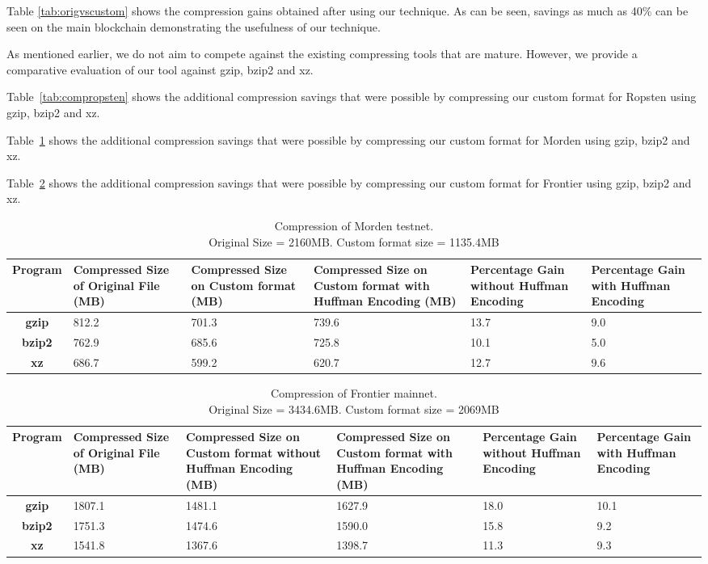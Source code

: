 \FloatBarrier
Table \ref{tab:origvscustom} shows the compression gains obtained after using our technique.
As can be seen, savings as much as 40\% can be seen on the main blockchain demonstrating the usefulness
of our technique.

As mentioned earlier, we do not aim to compete against the existing compressing tools that are mature.
However, we provide a comparative evaluation of our tool against gzip, bzip2 and xz. 

Table~\ref{tab:compropsten} 
shows the additional compression savings that were possible by compressing 
our custom format for Ropsten using gzip, bzip2 and xz.

Table~\ref{tab:compmorden} 
shows the additional compression savings that were possible by compressing 
our custom format for Morden using gzip, bzip2 and xz.

Table~\ref{tab:compfrontier} 
shows the additional compression savings that were possible by compressing 
our custom format for Frontier  using gzip, bzip2 and xz.




\begin{table}[!t]
\centering
\captionsetup{justification=centering}
\begin{tabular}{ >{\bfseries}c| p{2cm} | p{2cm} | p{2cm} | p{1.5cm} | p{1.5cm} }
	Program & {Compressed Size of Original File (MB)} & {Compressed Size on Custom format (MB)} & {Compressed Size on Custom format with Huffman Encoding (MB)} & Percentage Gain without Huffman Encoding & Percentage Gain with Huffman Encoding \\
  \hline
  gzip  & 812.2 & 701.3 & 739.6 & 13.7 & 9.0 \\
  bzip2 & 762.9 & 685.6 & 725.8 & 10.1 & 5.0 \\
  xz   & 686.7 & 599.2 &  620.7 & 12.7 & 9.6 \\
\end{tabular}
\caption{Compression of Morden testnet. \\Original Size = 2160MB. Custom format size = 1135.4MB}
\label{tab:compmorden}
\end{table}

\begin{table}[!b]
	\centering
\captionsetup{justification=centering}
\begin{tabular}{ >{\bfseries}c| p{2cm} | p{2cm} | p{2cm} | p{1.5cm} | p{1.5cm} }
	Program & {Compressed Size of Original File (MB)} & {Compressed Size on Custom format without Huffman Encoding (MB)} & {Compressed Size on Custom format with Huffman Encoding (MB)} &Percentage Gain without Huffman Encoding & Percentage Gain with Huffman Encoding\\
  \hline
  gzip  & 1807.1 & 1481.1 & 1627.9 & 18.0 & 10.1 \\
  bzip2 & 1751.3 & 1474.6 & 1590.0 & 15.8 & 9.2 \\
  xz   & 1541.8 & 1367.6 & 1398.7 & 11.3  & 9.3 \\
\end{tabular}
\caption{Compression of Frontier mainnet. \\ Original Size = 3434.6MB. Custom format size = 2069MB}
\label{tab:compfrontier}
\end{table}

